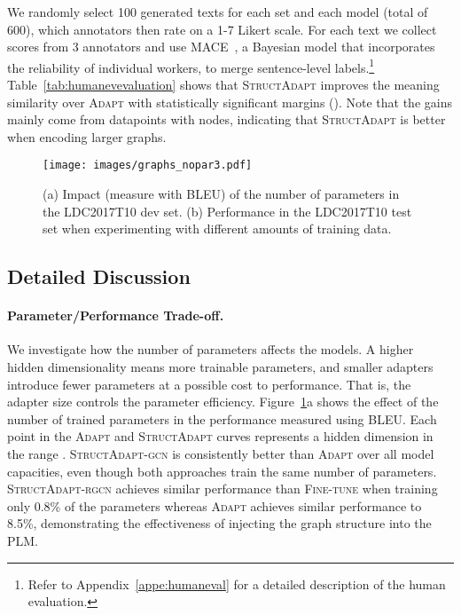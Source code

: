 \documentclass[11pt]{article}
\newcommand{\graphadapter}{{\small\textsc{StructAdapt}}\xspace}
\newcommand{\graphadaptergcn}{{\small\textsc{StructAdapt-gcn}}\xspace}
\newcommand{\graphadapterrgcn}{{\small\textsc{StructAdapt-rgcn}}\xspace}
\newcommand{\vanilladapter}{{\small\textsc{Adapt}}\xspace}
\newcommand{\finetune}{{\small\textsc{Fine-tune}}\xspace}
\begin{document}
We randomly select 100 generated texts for each set and each model (total of 600), which annotators then rate on a 1-7 Likert scale. For each text we collect scores from 3 annotators and use MACE~\cite{hovy-etal-2013-learning}, a Bayesian model that incorporates the reliability of individual workers, to merge sentence-level labels.\footnote{Refer to Appendix~\ref{appe:humaneval} for a detailed description of the human evaluation.} Table~\ref{tab:humanevevaluation} shows that \graphadapter improves the meaning similarity over \vanilladapter with statistically significant margins (). Note that the gains mainly come from datapoints with  nodes, indicating that \graphadapter is better when encoding larger graphs.



\begin{figure}[t]
\texttt{[image: images/graphs\_nopar3.pdf]}
    \caption{(a) Impact (measure with BLEU) of the number of parameters in the LDC2017T10 dev set. (b) Performance in the LDC2017T10 test set when experimenting with different amounts of training data.}
    \label{fig:hidden}
\end{figure}

\subsection{Detailed Discussion}

\paragraph{Parameter/Performance Trade-off.}

We investigate how the number of parameters affects the models. A higher hidden dimensionality means more trainable parameters, and smaller adapters introduce fewer parameters at a possible cost to performance. That is, the adapter size controls the parameter efficiency. Figure~\ref{fig:hidden}a shows the effect of the number of trained parameters in the performance measured using BLEU. Each point in the \vanilladapter and \graphadapter curves represents a hidden dimension in the range . \graphadaptergcn is consistently better than \vanilladapter over all model capacities, even though both approaches train the same number of parameters. \graphadapterrgcn achieves similar performance than \finetune when training only 0.8\% of the parameters whereas \vanilladapter achieves similar performance to 8.5\%, demonstrating the effectiveness of injecting the graph structure into the PLM.
\end{document}
